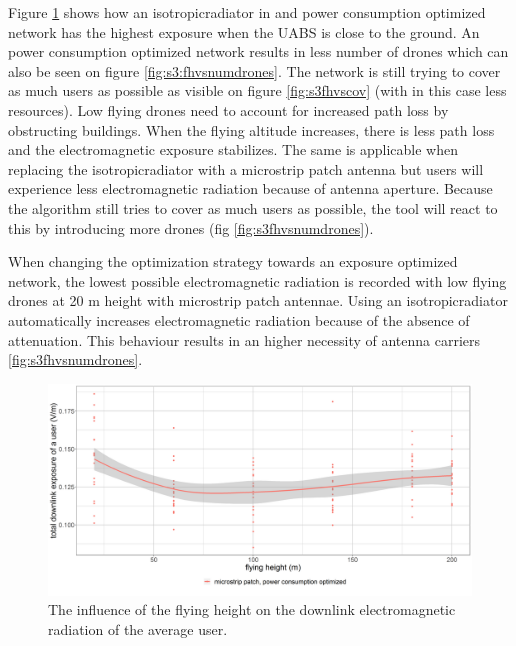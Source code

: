 Figure \ref{fig:s3fhvsdl} shows how an \gls{isotropicradiator} in and power consumption optimized network has the highest exposure when 
the \gls{UABS}  is close to the ground. An power consumption optimized network results in less number of drones which can also be seen 
on figure \ref{fig:s3:fhvsnumdrones}. The network is still trying to cover as much users as possible as visible on figure 
\ref{fig:s3fhvscov} (with in this case less resources). Low flying drones need to account for increased path loss by obstructing buildings.
When the flying altitude increases, there is less path loss and the electromagnetic exposure stabilizes. The same is applicable when replacing
the \gls{isotropicradiator} with a microstrip patch antenna but users will experience less electromagnetic radiation 
because of antenna aperture. Because the algorithm still tries to cover as much users as possible, the tool will react to this by 
introducing more drones (fig \ref{fig:s3fhvsnumdrones}).

When changing the optimization strategy towards an exposure optimized network, the lowest possible electromagnetic radiation is recorded
with low flying drones at 20 m height with microstrip patch antennae. Using an \gls{isotropicradiator} automatically increases electromagnetic 
radiation because of the absence of attenuation. This behaviour results in an higher necessity of antenna carriers \ref{fig:s3fhvsnumdrones}.


\begin{figure}[h!]
  \includegraphics[width=\textwidth]{../results/s3/fhvsdl.png}
  \caption{The influence of the flying height on the downlink electromagnetic radiation of the average user.}
  \label{fig:s3fhvsdl}
\end{figure}

